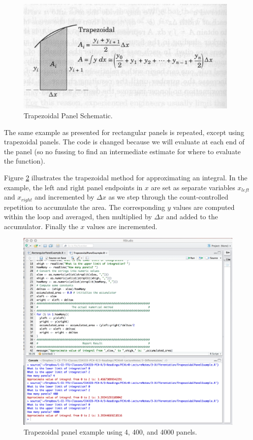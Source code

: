 \begin{figure}[h!] %
   \centering
   \includegraphics[width=4.3in]{./3-Differentation/TrapPanels.jpg} 
   \caption{Trapezoidal Panel Schematic.}
   \label{fig:TrapPanels}
\end{figure}

The same example as presented for rectangular panels is repeated, except using trapezoidal panels.  The code is changed because we will evaluate at each end of the panel (so no fussing to find an intermediate estimate for where to evaluate the function).

Figure \ref{fig:TrapExample} illustrates the trapezoidal method for approximating an integral.   In the example, the left and right panel endpoints in $x$ are set as separate variables $x_{left}$ and $x_{right}$ and incremented by $\Delta x$ as we step through the count-controlled repetition to accumulate the area.  The corresponding $y$ values are computed within the loop and averaged, then multiplied by $\Delta x$ and added to the accumulator.  Finally the $x$ values are incremented.
 
\begin{figure}[h!] %
   \centering
   \includegraphics[width=6in]{./3-Differentation/TrapExample.jpg} 
   \caption{Trapezoidal panel example using 4, 400, and 4000 panels.}
   \label{fig:TrapExample}
\end{figure}

